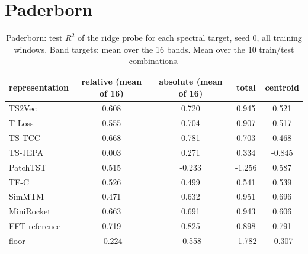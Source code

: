 \section{Paderborn}
\begin{table}[ht]
\centering
\footnotesize
\begin{tabular}{lcccc}
\toprule
representation & relative (mean of 16) & absolute (mean of 16) & total & centroid \\
\midrule
TS2Vec & 0.608 & 0.720 & 0.945 & 0.521 \\
T-Loss & 0.555 & 0.704 & 0.907 & 0.517 \\
TS-TCC & 0.668 & 0.781 & 0.703 & 0.468 \\
TS-JEPA & 0.003 & 0.271 & 0.334 & -0.845 \\
PatchTST & 0.515 & -0.233 & -1.256 & 0.587 \\
TF-C & 0.526 & 0.499 & 0.541 & 0.539 \\
SimMTM & 0.471 & 0.632 & 0.951 & 0.696 \\
\midrule
MiniRocket & 0.663 & 0.691 & 0.943 & 0.606 \\
\midrule
FFT reference & 0.719 & 0.825 & 0.898 & 0.791 \\
floor & -0.224 & -0.558 & -1.782 & -0.307 \\
\bottomrule
\end{tabular}
\caption{Paderborn: test $R^2$ of the ridge probe for each spectral target, seed 0, all training windows. Band targets: mean over the 16 bands. Mean over the 10 train/test combinations.}
\end{table}
